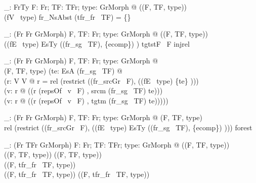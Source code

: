\begin{axdef}
  \abstractNoDirectInstancesF\_: \power  FrTy
\where
  \forall  F: Fr; TF: TFr; type: GrMorph @ (\abstractNoDirectInstancesF (F, TF, type)) \iff  \\ \quad
  (fV~ type) \inv  \limg  fr\_NsAbst (tfr\_fr~ TF) \rimg  = \{\}
\end{axdef}

\begin{axdef}
  \containmentNoSharingF\_: \power  (Fr \cross  Fr \cross  GrMorph)
\where
  \forall  F, TF: Fr; type: GrMorph @ (\containmentNoSharingF (F, TF, type)) \iff  \\ \quad
   ((fE~ type) \inv  \limg  EsTy ((fr\_sg~ TF), \{ecomp\}) \rimg ) \dres  tgtstF~ F \in injrel
\end{axdef}

\begin{axdef}
  \instMultsOkF\_: \power  (Fr \cross  Fr \cross  GrMorph)
\where
  \forall  F, TF: Fr; type: GrMorph @ \\ \quad 
  \instMultsOkF (F, TF, type) \iff  (\forall  te: EsA (fr\_sg~ TF) @ \\ \qquad 
  (\exists  r: V \rel  V @ r = rel (restrict ((fr\_srcGr~ F), ((fE~ type) \inv  \limg  \{te\} \rimg ))) \\ \qquad
  \land  (\forall  v: \dom  r @ (\multOk (r \limg  (repsOf~ v~ F) \rimg , srcm (fr\_sg~ TF) te))) \\ \qquad 
  \land  (\forall  v: \ran  r @ (\multOk (r \inv  \limg  (repsOf~ v~ F) \rimg , tgtm (fr\_sg~ TF) te)))))
\end{axdef}

\begin{axdef}
  \instContainmentForest \_: \power  (Fr \cross  Fr \cross  GrMorph)
\where
  \forall  F, TF: Fr; type: GrMorph @ \instContainmentForest (F, TF, type) \iff \\ \quad
    rel (restrict ((fr\_srcGr~ F), ((fE~ type) \inv  \limg  EsTy ((fr\_sg~ TF), \{ecomp\}) \rimg ))) \in forest
\end{axdef}

\begin{axdef}
  \isConformableF\_: \power  (Fr \cross  TFr \cross  GrMorph)
\where
  \forall  F: Fr; TF: TFr; type: GrMorph @ (\isConformableF (F, TF, type)) \iff  \\ \quad
  (\instanceEdgeTypesOkF (F, TF, type)) 
\land  (\abstractNoDirectInstancesF (F, TF, type)) \\ \quad
\land  (\containmentNoSharingF (F, tfr\_fr~ TF, type)) \\ \quad
\land  (\instMultsOkF (F, tfr\_fr~ TF, type)) \land  (\instContainmentForest (F, tfr\_fr~ TF, type))
\end{axdef}


